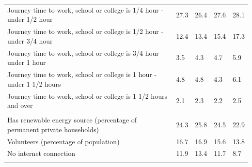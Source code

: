 \documentclass{article}
\begin{document}
\begin{table}[h]
\begin{tabular}{KTTTT}
Journey time to work, school or college is 1/4 hour - under 1/2 hour & 27.3& 26.4& 27.6& 28.1\\
Journey time to work, school or college is 1/2 hour - under 3/4 hour & 12.4& 13.4& 15.4& 17.3\\
Journey time to work, school or college is 3/4 hour - under 1 hour & 3.5& 4.3& 4.7& 5.9\\
Journey time to work, school or college is 1 hour - under 1 1/2 hours & 4.8& 4.8& 4.3& 6.1\\
Journey time to work, school or college is 1 1/2 hours and over & 2.1& 2.3& 2.2& 2.5\\
\hline
    \\ 
    \hline
Has renewable energy source (percentage of permanent private households) & 24.3& 25.8& 24.5& 22.9\\
    \hline
Volunteers (percentage of population) & 16.7& 16.9& 15.6& 13.8\\
    \hline
No internet connection& 11.9& 13.4& 11.7&  8.7\\
\hline
\end{tabular}
\end{table}
\end{document}
